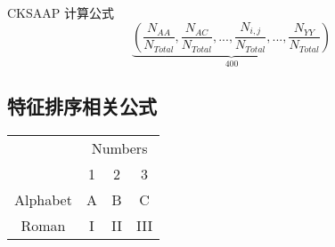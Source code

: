 CKSAAP 计算公式\cite{tung_computational_2008}
\begin{equation}
    \underbrace{( \frac{N_{AA}}{N_{Total}},\frac{N_{AC}}{N_{Total}},...,\frac{N_{i,j}}{N_{Total}},...,\frac{N_{YY}}{N_{Total}} )}_{400}
\end{equation}

\subsection{特征排序相关公式}
\begin{tabular}{cccc}
    \toprule
    & \multicolumn{3}{c}{Numbers} \\
    \cmidrule{2-4}
    & 1 & 2 & 3 \\
    \midrule
    Alphabet & A & B & C \\
    Roman & I & II& III \\
    \bottomrule
\end{tabular}